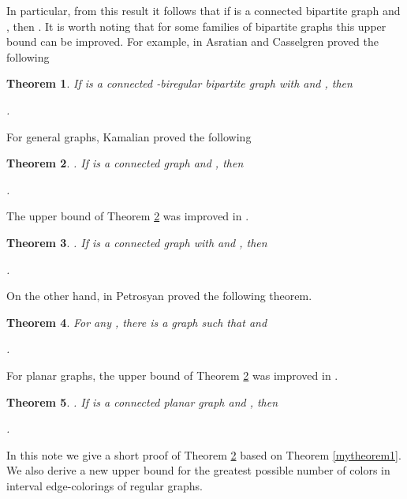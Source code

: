 \documentclass[fleqn,12pt,twoside]{article}
\newtheorem{theorem}{Theorem}
\begin{document}
In particular, from this result it follows that if  is a
connected bipartite graph and , then . It is worth noting that for some families of
bipartite graphs this upper bound can be improved. For example, in
\cite{b1} Asratian and Casselgren proved the following

\begin{theorem}
\label{mytheorem2} If  is a connected -biregular bipartite
graph with  and ,
then
\begin{center}
.
\end{center}
\end{theorem}

For general graphs, Kamalian proved the following

\begin{theorem}
\label{mytheorem3}\cite{b6}. If  is a connected graph and , then
\begin{center}
.
\end{center}
\end{theorem}

The upper bound of Theorem \ref{mytheorem3} was improved in
\cite{b5}.

\begin{theorem}
\label{mytheorem4}\cite{b5}. If  is a connected graph with  and , then
\begin{center}
.
\end{center}
\end{theorem}

On the other hand, in \cite{b7} Petrosyan proved the following
theorem.

\begin{theorem}
\label{mytheorem4} For any , there is a graph 
such that  and
\begin{center}
.
\end{center}
\end{theorem}

For planar graphs, the upper bound of Theorem \ref{mytheorem3} was
improved in \cite{b4}.

\begin{theorem}
\label{mytheorem6}\cite{b4}. If  is a connected planar graph and
, then
\begin{center}
.
\end{center}
\end{theorem}

In this note we give a short proof of Theorem \ref{mytheorem3} based
on Theorem \ref{mytheorem1}. We also derive a new upper bound for
the greatest possible number of colors in interval edge-colorings of
regular graphs.
\end{document}
